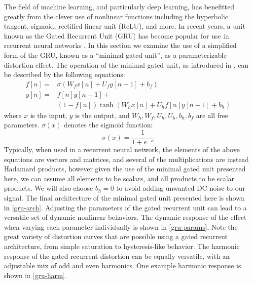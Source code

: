 \documentclass[twoside,a4paper]{article}
\begin{document}
%
The field of machine learning, and particularly deep learning, has benefitted
greatly from the clever use of nonlinear functions including the hyperbolic
tangent, sigmoid, rectified linear unit (ReLU), and more. In recent years,
a unit known as the Gated Recurrent Unit (GRU) has become popular for
use in recurrent neural networks \cite{gru_original}. In this section
we examine the use of a simplified form of the GRU, known as a ``minimal
gated unit'', as a parameterizable distortion effect.
\newline\newline
The operation of the minimal gated unit, as introduced in
\cite{minimal-gated-unit}, can be described by the following equations:
%
\begin{align}
    f[n] = &\sigma (W_f x[n] + U_f y[n-1] + b_f) \\
    y[n] = &f[n] y[n-1] + \\
    &(1 - f[n]) \tanh (W_h x[n] + U_h f[n] y[n-1] + b_h)
    \label{eq:minimal-gated-unit}
\end{align}
%
where $x$ is the input, $y$ is the output, and $W_h,W_f,U_h,U_h,b_h,b_f$
are all free parameters. $\sigma(x)$ denotes the sigmoid function:
%
\begin{equation}
    \sigma(x) = \frac{1}{1 + e^{-x}}
    \label{eq:sigmoid}
\end{equation}
%
Typically, when used in a recurrent neural network, the elements of the
above equations are vectors and matrices, and several of the multiplications
are instead Hadamard products, however given the use of the minimal gated
unit presented here, we can assume all elements to be scalars, and all
products to be scalar products. We will also choose $b_h=0$ to avoid
adding unwanted DC noise to our signal. The final architecture of the
minimal gated unit presented here is shown in \cref{gru-arch}.
\newline\newline
Adjusting the parameters of the gated recurrent unit can lead to a versatile
set of dynamic nonlinear behaviors. The dynamic response of the effect
when varying each parameter individually is shown in \cref{gru-params}.
Note the great variety of distortion curves that are possible using a
gated recurrent architecture, from simple saturation to hysteresis-like
behavior. The harmonic response of the gated recurrent distortion can be
equally versatile, with an adjustable mix of odd and even harmonics.
One example harmonic response is shown in \cref{gru-harm}.
\end{document}
